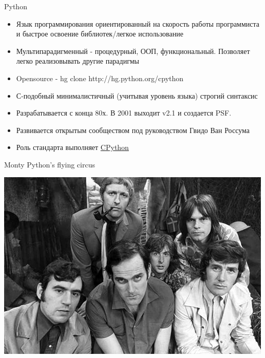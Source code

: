 \documentclass{article}
\begin{document}
\begin{center} Python \end{center}
\begin{itemize}
    \item Язык программирования ориентированный на скорость работы программиста и
        быстрое освоение библиотек/легкое использование
    \item Мультипарадигменный - процедурный, ООП, функциональный. Позволяет легко реализовывать другие парадигмы
    \item Opensource - hg clone http://hg.python.org/cpython
    \item С-подобный минималистичный (учитывая уровень языка) строгий синтаксис
    \item Разрабатывается с конца 80х. В 2001 выходит v2.1 и создается PSF.
    \item Развивается открытым сообществом под руководством Гвидо Ван Россума
    \item Роль стандарта выполняет \href{http://www.python.org}{CPython}
\end{itemize}
\newpage

\begin{center} Monty Python's flying circus \end{center}
\begin{center} \includegraphics{images/montypython.jpg} \end{center}
\newpage
\end{document}
